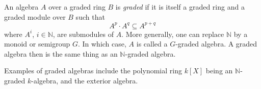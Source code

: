 \documentclass[12pt]{article}
\begin{document}
An algebra $A$ over a graded ring $B$ is \emph{graded} if it is itself a graded ring and a graded module over $B$ such that
$$A^p \cdot A^q \subseteq A^{p+q}$$
where $A^i$, $i \in \mathbb{N}$, are submodules of $A$.
More generally, one can replace $\mathbb{N}$ by a monoid or semigroup $G$.
In which case, $A$ is called a $G$-graded algebra.
A graded algebra then is the same thing as an $\mathbb{N}$-graded algebra.

Examples of graded algebras include the polynomial ring $k[X]$ being an $\mathbb{N}$-graded $k$-algebra, and the exterior algebra.
\end{document}
